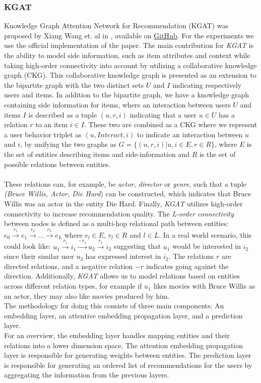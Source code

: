 \subsubsection{KGAT}
Knowledge Graph Attention Network for Recommendation (KGAT) was proposed by Xiang Wang et. al in \cite{KGAT}, available on \href{https://github.com/xiangwang1223/knowledge_graph_attention_network}{GitHub}.
For the experiments we use the official implementation of the paper.
The main contribution for \textit{KGAT} is the ability to model side information, such as item attributes and context while taking high-order connectivity into account by utilizing a collaborative knowledge graph (CKG).
This collaborative knowledge graph is presented as an extension to the bipartite graph with the two distinct sets $U$ and $I$ indicating respectively users and items.
In addition to the bipartite graph, we have a knowledge graph containing side information for items, where an interaction between users $U$ and items $I$ is described as a tuple $(u, r, i)$ indicating that a user $u \in U$ has a relation $r$ to an item $i \in I$.
These two are combined as a CKG where we represent a user behavior triplet as $(u, Interact, i)$ to indicate an interaction between $u$ and $i$, by unifying the two graphs as $G = \{(u, r, i) | u, i \in E, r \in R\}$, where $E$ is the set of entities describing items and side-information and $R$ is the set of possible relations between entities.\\\\
These relations can, for example, be \textit{actor, director} or \textit {genre}, such that a tuple \textit{(Bruce Willis, Actor, Die Hard}) can be constructed, which indicates that Bruce Willis was an actor in the entity Die Hard.
Finally, \textit{KGAT} utilizes high-order connectivity to increase recommendation quality.
The \textit{L-order connectivity} between nodes is defined as a multi-hop relational path between entities: $e_0 \overset{r_1}{\rightarrow} e_1 \overset{r_2}{\rightarrow} \dots \overset{r_L}{\rightarrow} e_L$ where $e_l \in E$, $r_l \in R$ and $l \in L$.
In a real world scenario, this could look like: $u_1 \overset{r_1}{\rightarrow} i_1 \overset{-r_1}{\rightarrow} u_2 \overset{r_1}{\rightarrow} i_2$ suggesting that $u_1$ would be interested in $i_2$ since their similar user $u_2$ has expressed interest in $i_2$.
The relations $r$ are directed relations, and a negative relation $-r$ indicates going against the direction.
Additionally, \textit{KGAT} allows us to model relations based on entities across different relation types, for example if $u_1$ likes movies with Bruce Willis as an actor, they may also like movies produced by him.
\\
The methodology for doing this consists of three main components: An embedding layer, an attentive embedding propagation layer, and a prediction layer.\\
For an overview, the embedding layer handles mapping entities and their relations into a lower dimension space.
The attention embedding propagation layer is responsible for generating weights between entities.
The prediction layer is responsible for generating an ordered list of recommendations for the users by aggregating the information from the previous layers.